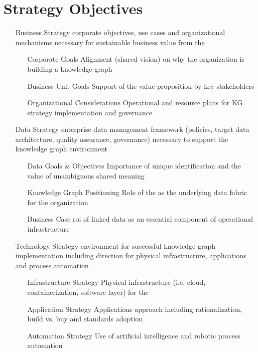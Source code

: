 \chapter{Strategy Objectives}
%
%
\begin{itemize}[leftmargin=2in,font=\bfseries]
  \item [Business Strategy] corporate objectives, use cases and organizational mechanisms necessary for sustainable business value from the 
  \begin{itemize}[labelwidth=1.5in,leftmargin=0in]
    \item [Corporate Goals] Alignment (shared vision) on why the organization is building a knowledge graph
    \item [Business Unit Goals] Support of the  value proposition by key  stakeholders
    \item [Organizational Considerations] Operational and resource plans for KG strategy implementation and governance
  \end{itemize}
  \item [Data Strategy] enterprise data management framework (policies, target data architecture, quality assurance, governance) necessary to support the knowledge graph environment
    \begin{itemize}[labelwidth=1.5in,leftmargin=0in]
      \item [Data Goals \& Objectives] Importance of unique identification and the value of unambiguous shared meaning
      \item [Knowledge Graph Positioning] Role of the  as the underlying data fabric for the organization
      \item [Business Case] \gls{roi} of linked data as an essential component of operational infrastructure
    \end{itemize}
  \item [Technology Strategy] environment for successful knowledge graph implementation including direction for physical infrastructure, applications and process automation
    \begin{itemize}[labelwidth=1.5in,leftmargin=0in]
      \item [Infrastructure Strategy] Physical infrastructure (i.e. cloud, containerization, software layer) for the 
      \item [Application Strategy] Applications approach including rationalization, build vs. buy and standards adoption
      \item [Automation Strategy] Use of artificial intelligence and robotic process automation
    \end{itemize}
\end{itemize}


